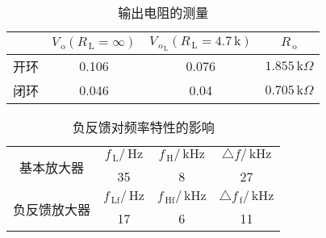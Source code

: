 \documentclass{ctexart}
\renewcommand{\rm}{\,\mathrm}
\begin{document}
    \begin{table}[htbp]
    	\centering
    	\caption{输出电阻的测量}
    	\begin{tabular}{|c|c|c|c|}
    		\hline
    		& $V_{\rm{o}}(R_{\rm{L}}=\infty)$     & $V_{\rm{o}_{\rm{L}}}(R_{\rm{L}}=4.7\rm{k})$     & \multicolumn{1}{c|}{$R_{\rm{o}}$} \\
    		\hline
    		开环    & 0.106 & 0.076 & $1.855\rm{k}\Omega$ \\
    		\hline
    		闭环    & 0.046 & 0.04  & $0.705\rm{k}\Omega$ \\
    		\hline
    	\end{tabular}%
    \end{table}%
    \begin{table}[htbp]
    	\centering
    	\caption{负反馈对频率特性的影响}
    	\begin{tabular}{|c|c|c|c|}
    		\hline
    		\multirow{2}{*}{基本放大器} & $f_{\rm{L}}/\rm{Hz}$     & $f_{\rm{H}}/\rm{kHz}$     & $\triangle f/\rm{kHz}$ \\
    		\cline{2-4}          & 35    & 8     & 27 \\
    		\hline
    		\multirow{2}{*}{负反馈放大器} & $f_{\rm{Lf}}/\rm{Hz}$     & $f_{\rm{Hf}}/\rm{kHz}$     & $\triangle f_{\rm{f}}/\rm{kHz}$ \\
    		\cline{2-4}          & 17    & 6     & 11 \\
    		\hline
    	\end{tabular}%
	\end{table}%
	
\end{document}
